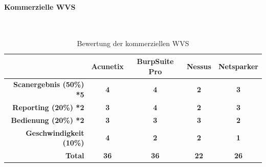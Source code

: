 \documentclass[12pt,oneside,a4paper,parskip,pointlessnumbers]{scrbook}
\begin{document}
     \paragraph{Kommerzielle WVS}
     \
       \begin{table}[H]
       \begin{tabular}{|r|c|c|c|c|}
       \hline
       \textbf{}       & \textbf{Acunetix} & \textbf{BurpSuite Pro} & \textbf{Nessus} & \textbf{Netsparker}  \\
       \hline
       \textbf{Scanergebnis (50\%) *5}    & \textbf{4}      &  \textbf{4}            & \textbf{2}      &   \textbf{3}         \\
       \hline
       \textbf{Reporting (20\%) *2}       &  \textbf{3}     &  \textbf{4}            & \textbf{2}      &   \textbf{3}         \\
       \hline
       \textbf{Bedienung (20\%) *2}       & \textbf{3}      & \textbf{3}           & \textbf{3}      & \textbf{2}        \\
       \hline
       \textbf{Geschwindigkeit (10\%)} & \textbf{4}       & \textbf{2}              & \textbf{2}      & \textbf{1}            \\
       \hline
       \textbf{Total}                 &  \textbf{36}     & \textbf{36}              & \textbf{22}       &  \textbf{26}                    \\
       \hline
       \end{tabular}
       \caption[Bewertung der kommerziellen WVS]{Bewertung der kommerziellen WVS}
     \end{table}
\end{document}
